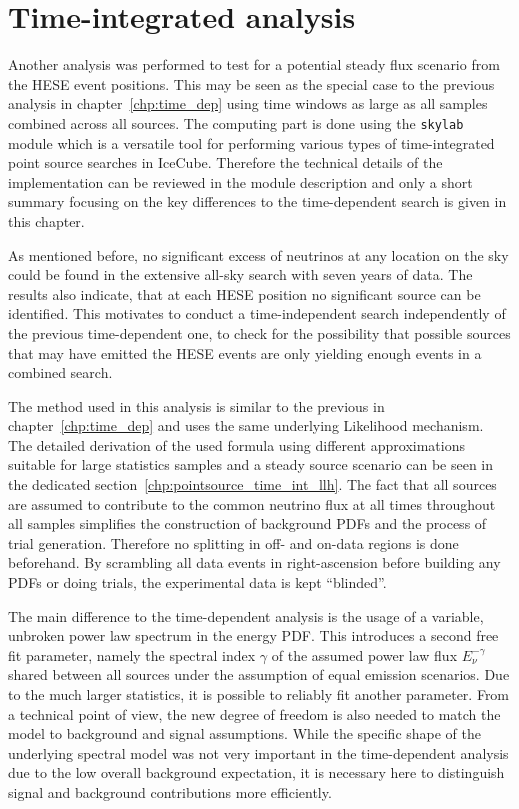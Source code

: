 \chapter{Time-integrated analysis}
  \label{chp:time_indep}
Another analysis was performed to test for a potential steady flux scenario from the HESE event positions.
This may be seen as the special case to the previous analysis in chapter~\ref{chp:time_dep} using time windows as large as all samples combined across all sources.
The computing part is done using the \lstinline!skylab!  module which is a versatile tool for performing various types of time-integrated point source searches in IceCube.
Therefore the technical details of the implementation can be reviewed in the module description and only a short summary focusing on the key differences to the time-dependent search is given in this chapter.

As mentioned before, no significant excess of neutrinos at any location on the sky could be found in the extensive all-sky search with seven years of data.
The results also indicate, that at each HESE position no significant source can be identified.
This motivates to conduct a time-independent search independently of the previous time-dependent one, to check for the possibility that possible sources that may have emitted the HESE events are only yielding enough events in a combined search.

The method used in this analysis is similar to the previous in chapter~\ref{chp:time_dep} and uses the same underlying Likelihood mechanism.
The detailed derivation of the used formula using different approximations suitable for large statistics samples and a steady source scenario can be seen in the dedicated section~\ref{chp:pointsource_time_int_llh}.
The fact that all sources are assumed to contribute to the common neutrino flux at all times throughout all samples simplifies the construction of background PDFs and the process of trial generation.
Therefore no splitting in off- and on-data regions is done beforehand.
By scrambling all data events in right-ascension before building any PDFs or doing trials, the experimental data is kept \enquote{blinded}.

The main difference to the time-dependent analysis is the usage of a variable, unbroken power law spectrum in the energy PDF.
This introduces a second free fit parameter, namely the spectral index $\gamma$ of the assumed power law flux $E_\nu^{-\gamma}$ shared between all sources under the assumption of equal emission scenarios.
Due to the much larger statistics, it is possible to reliably fit another parameter.
From a technical point of view, the new degree of freedom is also needed to match the model to background and signal assumptions.
While the specific shape of the underlying spectral model was not very important in the time-dependent analysis due to the low overall background expectation, it is necessary here to distinguish signal and background contributions more efficiently.

